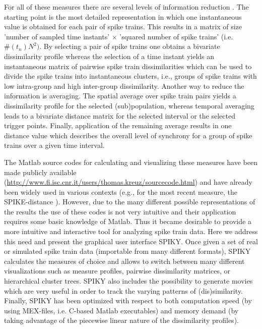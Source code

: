 \documentclass[10pt,twocolumn]{elsart5p}
\begin{document}
For all of these measures there are several levels of information reduction \citep{Kreuz12}. The starting point is the most detailed representation in which one instantaneous value is obtained for each pair of spike trains. This results in a matrix of size ’number of sampled time instants’ × ’squared number of spike trains’ (i.e. $\#(t_n)N^2)$. By selecting a pair of spike trains one obtains a bivariate dissimilarity profile whereas the selection of a time instant yields an instantaneous matrix of pairwise spike train dissimilarities which can be used to divide the spike trains into instantaneous clusters, i.e., groups of spike trains with low intra-group and high inter-group dissimilarity. Another way to reduce the information is averaging. The spatial average over spike train pairs yields a dissimilarity profile for the selected (sub)population, whereas temporal averaging leads to a bivariate distance matrix for the selected interval or the selected trigger points. Finally, application of the remaining average results in one distance value which describes the overall level of synchrony for a group of spike trains over a given time interval.

The Matlab source codes for calculating and visualizing these measures have been made publicly available (\url{http://www.fi.isc.cnr.it/users/thomas.kreuz/sourcecode.html}) and have already been widely used in various contexts (e.g., for the most recent measure, the SPIKE-distance \citet{Papoutsi13, DiPoppa13, Sacre14}). However, due to the many different possible representations of the results the use of these codes is not very intuitive and their application requires some basic knowledge of Matlab. Thus it became desirable to provide a more intuitive and interactive tool for analyzing spike train data. Here we address this need and present the graphical user interface SPIKY. Once given a set of real or simulated spike train data (importable from many different formats), SPIKY calculates the measures of choice and allows to switch between many different visualizations such as measure profiles, pairwise dissimilarity matrices, or hierarchical cluster trees. SPIKY also includes the possibility to generate movies which are very useful in order to track the varying patterns of (dis)similarity. Finally, SPIKY has been optimized with respect to both computation speed (by using MEX-files, i.e. C-based Matlab executables) and memory demand (by taking advantage of the piecewise linear nature of the dissimilarity profiles).
\end{document}
